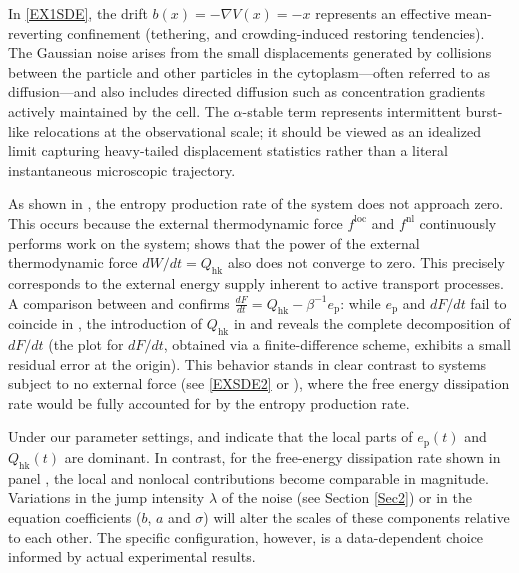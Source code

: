\documentclass[10pt]{article}
\theoremstyle{definition}
\numberwithin{equation}{section}
\begin{document}
In \eqref{EX1SDE}, the drift $b(x)=-\nabla V(x)=-x$ represents an effective mean-reverting confinement (tethering, and crowding-induced restoring tendencies). 
The Gaussian noise arises from the small displacements generated by collisions between the particle and other particles in the cytoplasm—often referred to as diffusion—and also includes directed diffusion such as concentration gradients actively maintained by the cell. 
The $\alpha$-stable term represents intermittent burst-like relocations at the observational scale; it should be viewed as an idealized limit capturing heavy-tailed displacement statistics rather than a literal instantaneous microscopic trajectory.

As shown in , the entropy production rate of the system does not approach zero. This occurs because the external thermodynamic force $f^\mathrm{loc}$ and $f^\mathrm{nl}$ continuously performs work on the system;  shows that the power of the external thermodynamic force $dW/dt=Q_\mathrm{hk}$ also does not converge to zero. This precisely corresponds to the external energy supply inherent to active transport processes. A comparison between  and  confirms $\frac{dF}{dt}=Q_\mathrm{hk}-\beta^{-1}e_\mathrm{p}$: while $e_\mathrm{p}$ and $dF/dt$ fail to coincide in , the introduction of $Q_\mathrm{hk}$ in  and  reveals the complete decomposition of $dF/dt$ (the plot for $dF/dt$, obtained via a finite-difference scheme, exhibits a small residual error at the origin). This behavior stands in clear contrast to systems subject to no external force (see \eqref{EXSDE2} or \cite{ZL25}), where the free energy dissipation rate would be fully accounted for by the entropy production rate.


Under our parameter settings,  and  indicate that the local parts of $e_\mathrm{p}(t)$ and $Q_\mathrm{hk}(t)$ are dominant. In contrast, for the free-energy dissipation rate shown in panel , the local and nonlocal contributions become comparable in magnitude. Variations in the jump intensity $\lambda$ of the noise (see Section \ref{Sec2}) or in the equation coefficients ($b$, $a$ and $\sigma$) will alter the scales of these components relative to each other. The specific configuration, however, is a data-dependent choice informed by actual experimental results.
\end{document}
